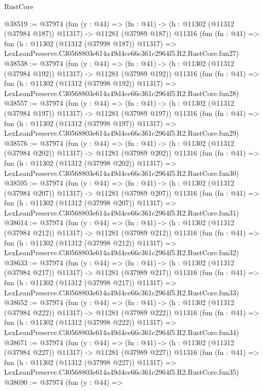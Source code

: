 \begin{lexlean}{RustCore}
\begin{coremodule}
@38519 := @37974
    (fun (y : @44) =>
    (fn : @41) -> (h : @11302 (@11312 (@37984 @187)) @11317) -> @11281 (@37989 @187))
    @11316
    (fun (fn : @41) =>
    fun (h : @11302 (@11312 (@37998 @187)) @11317) =>
    LexLeanPreserve.C30568803e614a49d4ce66c361c2964f5.R2.RustCore.fun27)
@38538 := @37974
    (fun (y : @44) =>
    (fn : @41) -> (h : @11302 (@11312 (@37984 @192)) @11317) -> @11281 (@37989 @192))
    @11316
    (fun (fn : @41) =>
    fun (h : @11302 (@11312 (@37998 @192)) @11317) =>
    LexLeanPreserve.C30568803e614a49d4ce66c361c2964f5.R2.RustCore.fun28)
@38557 := @37974
    (fun (y : @44) =>
    (fn : @41) -> (h : @11302 (@11312 (@37984 @197)) @11317) -> @11281 (@37989 @197))
    @11316
    (fun (fn : @41) =>
    fun (h : @11302 (@11312 (@37998 @197)) @11317) =>
    LexLeanPreserve.C30568803e614a49d4ce66c361c2964f5.R2.RustCore.fun29)
@38576 := @37974
    (fun (y : @44) =>
    (fn : @41) -> (h : @11302 (@11312 (@37984 @202)) @11317) -> @11281 (@37989 @202))
    @11316
    (fun (fn : @41) =>
    fun (h : @11302 (@11312 (@37998 @202)) @11317) =>
    LexLeanPreserve.C30568803e614a49d4ce66c361c2964f5.R2.RustCore.fun30)
@38595 := @37974
    (fun (y : @44) =>
    (fn : @41) -> (h : @11302 (@11312 (@37984 @207)) @11317) -> @11281 (@37989 @207))
    @11316
    (fun (fn : @41) =>
    fun (h : @11302 (@11312 (@37998 @207)) @11317) =>
    LexLeanPreserve.C30568803e614a49d4ce66c361c2964f5.R2.RustCore.fun31)
@38614 := @37974
    (fun (y : @44) =>
    (fn : @41) -> (h : @11302 (@11312 (@37984 @212)) @11317) -> @11281 (@37989 @212))
    @11316
    (fun (fn : @41) =>
    fun (h : @11302 (@11312 (@37998 @212)) @11317) =>
    LexLeanPreserve.C30568803e614a49d4ce66c361c2964f5.R2.RustCore.fun32)
@38633 := @37974
    (fun (y : @44) =>
    (fn : @41) -> (h : @11302 (@11312 (@37984 @217)) @11317) -> @11281 (@37989 @217))
    @11316
    (fun (fn : @41) =>
    fun (h : @11302 (@11312 (@37998 @217)) @11317) =>
    LexLeanPreserve.C30568803e614a49d4ce66c361c2964f5.R2.RustCore.fun33)
@38652 := @37974
    (fun (y : @44) =>
    (fn : @41) -> (h : @11302 (@11312 (@37984 @222)) @11317) -> @11281 (@37989 @222))
    @11316
    (fun (fn : @41) =>
    fun (h : @11302 (@11312 (@37998 @222)) @11317) =>
    LexLeanPreserve.C30568803e614a49d4ce66c361c2964f5.R2.RustCore.fun34)
@38671 := @37974
    (fun (y : @44) =>
    (fn : @41) -> (h : @11302 (@11312 (@37984 @227)) @11317) -> @11281 (@37989 @227))
    @11316
    (fun (fn : @41) =>
    fun (h : @11302 (@11312 (@37998 @227)) @11317) =>
    LexLeanPreserve.C30568803e614a49d4ce66c361c2964f5.R2.RustCore.fun35)
@38690 := @37974
    (fun (y : @44) =>

\end{coremodule}
\end{lexlean}
